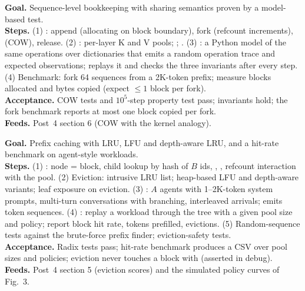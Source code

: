 \textbf{Goal.} Sequence-level bookkeeping with sharing semantics proven by a model-based test.\\
\textbf{Steps.} (1) : append (allocating on block boundary), fork (refcount increments),  (COW), release. (2) : per-layer K and V pools; ; . (3) : a Python model of the same operations over dictionaries that emits a random operation trace and expected observations;  replays it and checks the three invariants after every step. (4) Benchmark: fork 64 sequences from a 2K-token prefix; measure blocks allocated and bytes copied (expect $\le 1$ block per fork).\\
\textbf{Acceptance.} COW tests and $10^5$-step property test pass; invariants hold; the fork benchmark reports at most one block copied per fork.\\
\textbf{Feeds.} Post~4 section 6 (COW with the kernel analogy).

\textbf{Goal.} Prefix caching with LRU, LFU and depth-aware LRU, and a hit-rate benchmark on agent-style workloads.\\
\textbf{Steps.} (1) : node = block, child lookup by hash of $B$ ids, , , refcount interaction with the pool. (2) Eviction: intrusive LRU list; heap-based LFU and depth-aware variants; leaf exposure on eviction. (3) : $A$ agents with 1--2K-token system prompts, multi-turn conversations with branching, interleaved arrivals; emits token sequences. (4) : replay a workload through the tree with a given pool size and policy; report block hit rate, tokens prefilled, evictions. (5) Random-sequence tests against the brute-force prefix finder; eviction-safety tests.\\
\textbf{Acceptance.} Radix tests pass; hit-rate benchmark produces a CSV over pool sizes and policies; eviction never touches a block with  (asserted in debug).\\
\textbf{Feeds.} Post~4 section 5 (eviction scores) and the simulated policy curves of Fig.~3.

